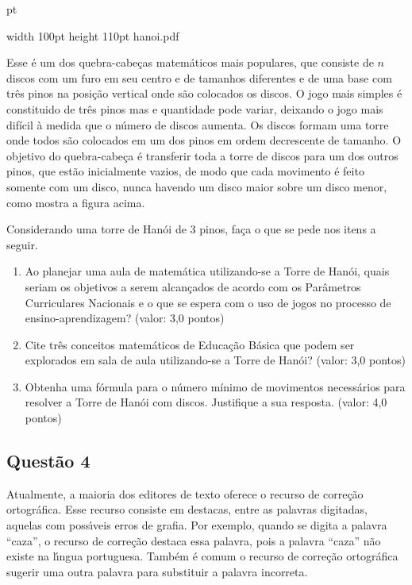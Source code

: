  pt

\pdfximage width 100pt height 110pt {hanoi.pdf}

\centerline{\pdfrefximage\pdflastximage}

Esse \'e um dos quebra-cabe\c cas matem\'aticos mais populares, que consiste de $n$ discos com um furo em seu centro e de tamanhos diferentes e de uma base com tr\^es pinos na posi\c c\~ao vertical onde s\~ao colocados os discos. O jogo mais simples \'e constituido de tr\^es pinos mas e quantidade pode variar, deixando o jogo mais dif\'icil \`a medida que o n\'umero de discos aumenta. Os discos formam uma torre onde todos s\~ao colocados em um dos pinos em ordem decrescente de tamanho. O objetivo do quebra-cabe\c ca \'e transferir toda a torre de discos para um dos outros pinos, que est\~ao inicialmente vazios, de modo que cada movimento \'e feito somente com um disco, nunca havendo um disco maior sobre um disco menor, como mostra a figura acima.

Considerando uma torre de Han\'oi de 3 pinos, fa\c ca o que se pede nos itens a seguir.

\begin{enumerate}

\item[(a)] Ao planejar uma aula de matem\'atica utilizando-se a Torre de Han\'oi, quais seriam os objetivos a serem alcan\c cados de acordo com os Par\^ametros Curriculares Nacionais e o que se espera com o uso de jogos no processo de ensino-aprendizagem? (valor: 3,0 pontos)

\item[(b)] Cite tr\^es conceitos matem\'aticos de Educa\c c\~ao B\'asica que podem ser explorados em sala de aula utilizando-se a Torre de Han\'oi? (valor: 3,0 pontos)

\item[(c)] Obtenha uma f\'ormula para o n\'umero m\'inimo de movimentos necess\'arios para resolver a Torre de Han\'oi com discos. Justifique a sua resposta. (valor: 4,0 pontos)

\end{enumerate}

\subsection{\color{blue} Quest\~ao 4}

Atualmente, a maioria dos editores de texto oferece o recurso de corre\c c\~ao ortogr\'afica. Esse recurso consiste em destacas, entre as palavras digitadas, aquelas com poss\'\i veis erros de grafia. Por exemplo, quando se digita a palavra ``caza'', o recurso de corre\c c\~ao destaca essa palavra, pois a palavra ``caza'' n\~ao existe na l\'\i ngua portuguesa. Tamb\'em \'e comum o recurso de corre\c c\~ao ortogr\'afica sugerir uma outra palavra para substituir a palavra incorreta.

